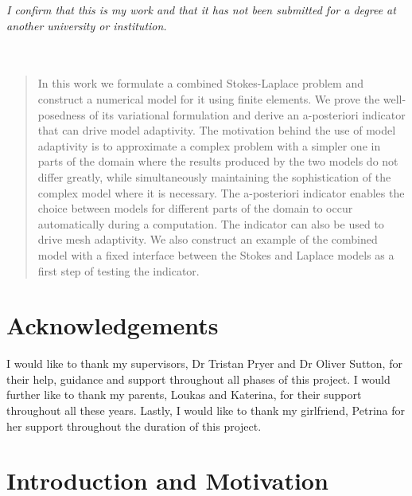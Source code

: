 \documentclass[12pt,a4paper]{article}
\theoremstyle{definition}
\begin{document}
\pagebreak
\thispagestyle{empty}
\emph{I confirm that this is my work and that it has not been submitted for a degree at another university or institution.\\}
\emph{\\}
\emph{\\}
	\vspace{1\baselineskip} 
\pagebreak
\pagebreak
\thispagestyle{empty}
\begin{abstract}
In this work we formulate a combined Stokes-Laplace problem and construct a numerical model for it using finite elements.  We prove the well-posedness of its variational formulation and derive an a-posteriori indicator that can drive model adaptivity.  The motivation behind the use of model adaptivity is to approximate a complex problem with a simpler one in parts of the domain where the results produced by the two models do not differ greatly, while simultaneously maintaining the sophistication of the complex model where it is necessary.  The a-posteriori indicator enables the choice between models for different parts of the domain to occur automatically during a computation.  The indicator can also be used to drive mesh adaptivity.  We also construct an example of the combined model with a fixed interface between the Stokes and Laplace models as a first step of testing the indicator.
\end{abstract}
\thispagestyle{empty}
\pagebreak
\pagebreak
\thispagestyle{empty}
\section*{Acknowledgements}
I would like to thank my supervisors, Dr Tristan Pryer and Dr Oliver Sutton, for their help, guidance and support throughout all phases of this project.  I would further like to thank my parents, Loukas and Katerina, for their support throughout all these years.  Lastly, I would like to thank my girlfriend, Petrina for her support throughout the duration of this project.

\thispagestyle{empty}
\pagebreak
{}

\thispagestyle{empty}
\newpage
\tableofcontents
\thispagestyle{empty}
\newpage
\setcounter{page}{1}


\section{Introduction and Motivation}
\end{document}
